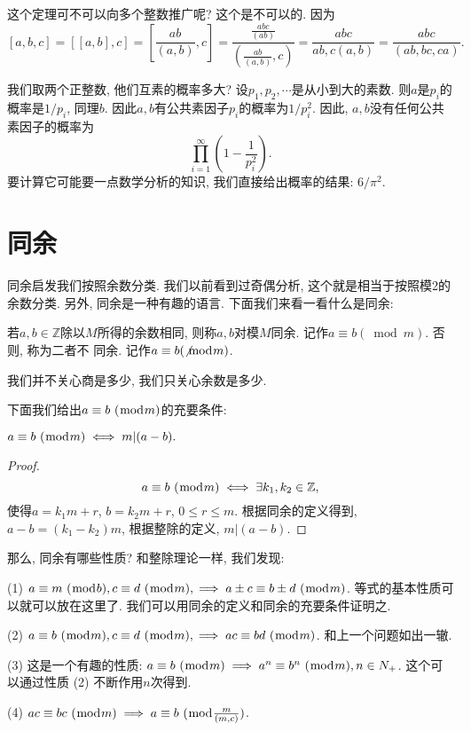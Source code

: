 这个定理可不可以向多个整数推广呢? 这个是不可以的. 因为$$[a,b,c]=[[a,b],c]=\left[\frac{ab}{(a,b)},c\right]=\frac{\frac{abc}{(ab)}}{\left(\frac{ab}{(a,b)},c\right)}=\frac 
{abc}{ab,c(a,b)}=\frac{abc}{(ab, bc, ca)}. $$

我们取两个正整数, 他们互素的概率多大? 设$p_1, p_2, \cdots$是从小到大的素数. 
则$a$是$p_i$的概率是$1/p_i$, 同理$b$. 因此$a,b $有公共素因子$p_i$的概率为$1/p_i^2$.
因此, $a, b$没有任何公共素因子的概率为
$$
\prod_{i=1}^{\infty} \left(1-\frac 1 {p_i^2}\right).
$$
要计算它可能要一点数学分析的知识, 我们直接给出概率的结果: $6/\pi^2$. 

\section{同余} 
同余启发我们按照余数分类. 我们以前看到过奇偶分析, 这个就是相当于按照模2的余数分类. 另外, 
同余是一种有趣的语言. 下面我们来看一看什么是同余: 

\begin{definition}
    若$a,b\in \mathbb Z$除以$M$所得的余数相同, 
    则称$a,b$对模$M$同余. 记作$a\equiv b (\bmod m)$. 否则, 称为二者不
    同余. 记作$a\equiv b (\not \bmod m)$. 
\end{definition}

我们并不关心商是多少, 我们只关心余数是多少. 

下面我们给出${a} \equiv {b} ~(\bmod {m})$的充要条件: 
\begin{theorem}
    ${a} \equiv {b} ~(\bmod {m}) \iff m|(a-b).$
\end{theorem}
\begin{proof}
    $${a} \equiv {b} ~(\bmod {m}) \iff\exists k_1, k_2\in \mathbb Z,$$使得$a=k_1m+r$, $b=k_2m+r$,
    $0\leq r\le m$. 根据同余的定义得到, $a-b=(k_1-k_2)m$, 根据整除的定义, $m|(a-b)$.  
\end{proof}

那么, 同余有哪些性质? 和整除理论一样, 我们发现: 

(1) ${a} \equiv {m} ~(\bmod {b}), {c} \equiv {d} ~(\bmod {m}), \implies {a\pm c} \equiv {b\pm d} ~(\bmod {m})$. 等式的基本性质可以就可以放在这里了. 
我们可以用同余的定义和同余的充要条件证明之. 

(2) ${a} \equiv {b} ~(\bmod {m}), {c} \equiv {d} ~(\bmod {m}), \implies {ac} \equiv {bd} ~(\bmod {m})$. 和上一个问题如出一辙. 

(3) 这是一个有趣的性质: ${a} \equiv {b} ~(\bmod {m})\implies {a^n} \equiv {b^n} ~(\bmod {m}), n\in N_+$. 这个可以通过性质
(2) 不断作用$n$次得到. 

(4) ${ac} \equiv {bc} ~(\bmod {m}) \implies {a} \equiv {b} ~(\bmod {m\over (m,c)})$. 

